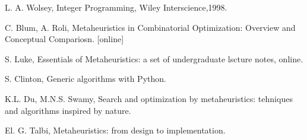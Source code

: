 \documentclass[12pt,a4paper]{amsart}
\theoremstyle{definition} %
\theoremstyle{plain} %
\begin{document}
\begin{thebibliography}{9}
L. A. Wolsey, Integer Programming, Wiley Interscience,1998. 

 
C. Blum, A. Roli, Metaheuristics in Combinatorial Optimization: Overview and Conceptual Compariosn. [online]
 
S. Luke, Essentials of Metaheuristics: a set of undergraduate lscture notes, online. 

S. Clinton, Generic algorithms with Python.

K.L. Du, M.N.S. Swamy, Search and optimization by metaheuristics: tehniques and algorithms inspired by nature. 


El. G. Talbi, Metaheuristics: from design to implementation.

\end{thebibliography}
\end{document}
